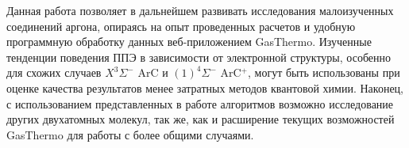\documentclass[12pt]{extarticle}
\begin{document}
    Данная работа позволяет в дальнейшем развивать исследования малоизученных соединений аргона, опираясь на опыт проведенных расчетов и удобную программную обработку данных веб-приложением GasThermo. Изученные тенденции поведения ППЭ в зависимости от электронной структуры, особенно для схожих случаев $X^3\Sigma^-$ ArC и $(1)^4 \Sigma^-$ ArC$^+$, могут быть использованы при оценке качества результатов менее затратных методов квантовой химии. Наконец, с использованием представленных в работе алгоритмов возможно исследование других двухатомных молекул, так же, как и расширение текущих возможностей GasThermo для работы с более общими случаями.
    
    \newpage
    
    
    
    \nocite{*}
    
    
\end{document}
